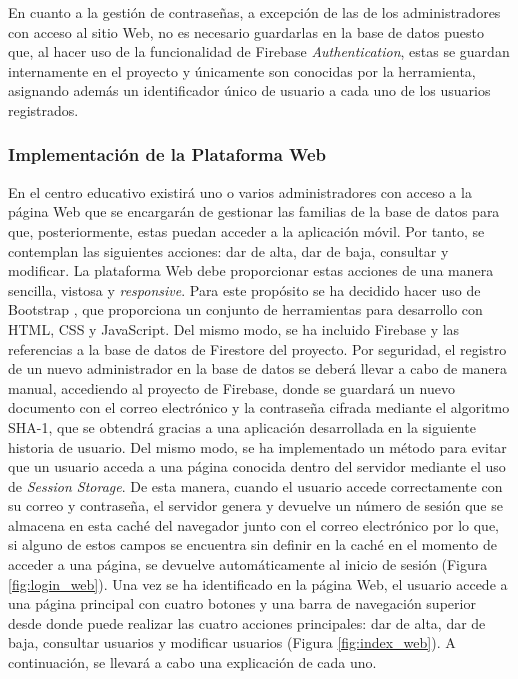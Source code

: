 En cuanto a la gestión de contraseñas, a excepción de las de los administradores con acceso al sitio Web, no es necesario guardarlas en la base de datos  puesto que, al hacer uso de la funcionalidad de Firebase \textit{Authentication}, estas se guardan internamente en el proyecto y únicamente son conocidas por la herramienta, asignando además un identificador único de usuario a cada uno de los usuarios registrados.

\subsubsection{Implementación de la Plataforma Web}
En el centro educativo existirá uno o varios administradores con acceso a la página Web que se encargarán de gestionar las familias de la base de datos para que, posteriormente, estas puedan acceder a la aplicación móvil. Por tanto, se contemplan las siguientes acciones: dar de alta, dar de baja, consultar y modificar. La plataforma Web debe proporcionar estas acciones de una manera sencilla, vistosa y \textit{responsive}. Para este propósito se ha decidido hacer uso de Bootstrap \cite{Bootstrap}, que proporciona un conjunto de herramientas para desarrollo con HTML, CSS y JavaScript. Del mismo modo, se ha incluido Firebase y las referencias a la base de datos de Firestore del proyecto. Por seguridad, el registro de un nuevo administrador en la base de datos se deberá llevar a cabo de manera manual, accediendo al proyecto de Firebase, donde se guardará un nuevo documento con el correo electrónico y la contraseña cifrada mediante el algoritmo SHA-1, que se obtendrá gracias a una aplicación desarrollada en la siguiente historia de usuario. Del mismo modo, se ha implementado un método para evitar que un usuario acceda a una página conocida dentro del servidor mediante el uso de \textit{Session Storage}. De esta manera, cuando el usuario accede correctamente con su correo y contraseña, el servidor genera y devuelve un número de sesión que se almacena en esta caché del navegador junto con el correo electrónico por lo que, si alguno de estos campos se encuentra sin definir en la caché en el momento de acceder a una página, se devuelve automáticamente al inicio de sesión (Figura \ref{fig:login_web}). Una vez se ha identificado en la página Web, el usuario accede a una página principal con cuatro botones y una barra de navegación superior desde donde puede realizar las cuatro acciones principales: dar de alta, dar de baja, consultar usuarios y modificar usuarios (Figura \ref{fig:index_web}). A continuación, se llevará a cabo una explicación de cada uno.

